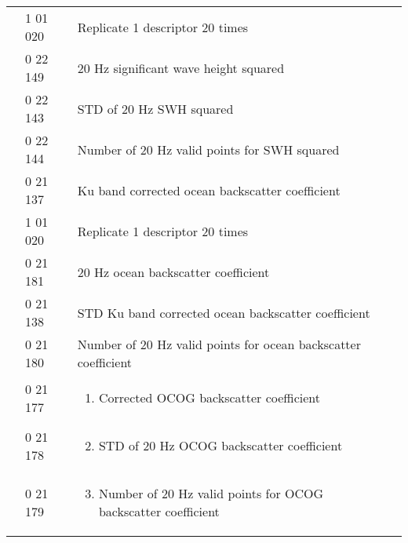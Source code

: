 \begin{longtable}[]{@{}llll@{}}
& 1 01 020 & Replicate 1 descriptor 20 times &\tabularnewline
& 0 22 149 & 20 Hz significant wave height squared &\tabularnewline
& 0 22 143 & STD of 20 Hz SWH squared &\tabularnewline
& 0 22 144 & Number of 20 Hz valid points for SWH squared &\tabularnewline
& 0 21 137 & Ku band corrected ocean backscatter coefficient &\tabularnewline
& 1 01 020 & Replicate 1 descriptor 20 times &\tabularnewline
& 0 21 181 & 20 Hz ocean backscatter coefficient &\tabularnewline
& 0 21 138 & STD Ku band corrected ocean backscatter coefficient &\tabularnewline
& 0 21 180 & Number of 20 Hz valid points for ocean backscatter coefficient &\tabularnewline
\begin{minipage}[t]{0.22\columnwidth}\raggedright
\strut
\end{minipage} & \begin{minipage}[t]{0.22\columnwidth}\raggedright
0 21 177\strut
\end{minipage} & \begin{minipage}[t]{0.22\columnwidth}\raggedright
\begin{enumerate}
\item
  Corrected OCOG backscatter coefficient
\end{enumerate}\strut
\end{minipage} & \begin{minipage}[t]{0.22\columnwidth}\raggedright
\strut
\end{minipage}\tabularnewline
\begin{minipage}[t]{0.22\columnwidth}\raggedright
\strut
\end{minipage} & \begin{minipage}[t]{0.22\columnwidth}\raggedright
0 21 178\strut
\end{minipage} & \begin{minipage}[t]{0.22\columnwidth}\raggedright
\begin{enumerate}
\setcounter{enumi}{1}
\item
  STD of 20 Hz OCOG backscatter coefficient
\end{enumerate}\strut
\end{minipage} & \begin{minipage}[t]{0.22\columnwidth}\raggedright
\strut
\end{minipage}\tabularnewline
\begin{minipage}[t]{0.22\columnwidth}\raggedright
\strut
\end{minipage} & \begin{minipage}[t]{0.22\columnwidth}\raggedright
0 21 179\strut
\end{minipage} & \begin{minipage}[t]{0.22\columnwidth}\raggedright
\begin{enumerate}
\setcounter{enumi}{2}
\item
  Number of 20 Hz valid points for OCOG backscatter coefficient
\end{enumerate}\strut
\end{minipage} & \begin{minipage}[t]{0.22\columnwidth}\raggedright
\strut
\end{minipage}\tabularnewline
\bottomrule
\end{longtable}

